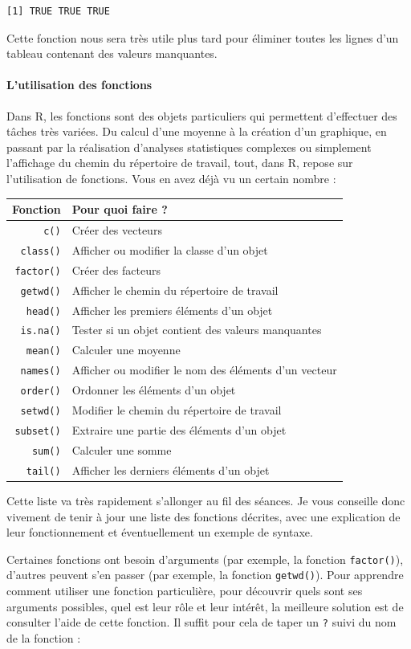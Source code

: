 \documentclass[a4paperpaper,]{article}
\let\oldparagraph\paragraph
\renewcommand{\paragraph}[1]{\oldparagraph{#1}\mbox{}}
\begin{document}
\begin{verbatim}
[1] TRUE TRUE TRUE
\end{verbatim}

Cette fonction nous sera très utile plus tard pour éliminer toutes les lignes d'un tableau contenant des valeurs manquantes.

\hypertarget{functions}{%
\paragraph{L'utilisation des fonctions}\label{functions}}

Dans R, les fonctions sont des objets particuliers qui permettent d'effectuer des tâches très variées. Du calcul d'une moyenne à la création d'un graphique, en passant par la réalisation d'analyses statistiques complexes ou simplement l'affichage du chemin du répertoire de travail, tout, dans R, repose sur l'utilisation de fonctions. Vous en avez déjà vu un certain nombre :

\begin{longtable}[]{@{}rl@{}}
\toprule
Fonction & Pour quoi faire ?\tabularnewline
\midrule
\endhead
\texttt{c()} & Créer des vecteurs\tabularnewline
\texttt{class()} & Afficher ou modifier la classe d'un objet\tabularnewline
\texttt{factor()} & Créer des facteurs\tabularnewline
\texttt{getwd()} & Afficher le chemin du répertoire de travail\tabularnewline
\texttt{head()} & Afficher les premiers éléments d'un objet\tabularnewline
\texttt{is.na()} & Tester si un objet contient des valeurs manquantes\tabularnewline
\texttt{mean()} & Calculer une moyenne\tabularnewline
\texttt{names()} & Afficher ou modifier le nom des éléments d'un vecteur\tabularnewline
\texttt{order()} & Ordonner les éléments d'un objet\tabularnewline
\texttt{setwd()} & Modifier le chemin du répertoire de travail\tabularnewline
\texttt{subset()} & Extraire une partie des éléments d'un objet\tabularnewline
\texttt{sum()} & Calculer une somme\tabularnewline
\texttt{tail()} & Afficher les derniers éléments d'un objet\tabularnewline
\bottomrule
\end{longtable}

Cette liste va très rapidement s'allonger au fil des séances. Je vous conseille donc vivement de tenir à jour une liste des fonctions décrites, avec une explication de leur fonctionnement et éventuellement un exemple de syntaxe.

Certaines fonctions ont besoin d'arguments (par exemple, la fonction \texttt{factor()}), d'autres peuvent s'en passer (par exemple, la fonction \texttt{getwd()}). Pour apprendre comment utiliser une fonction particulière, pour découvrir quels sont ses arguments possibles, quel est leur rôle et leur intérêt, la meilleure solution est de consulter l'aide de cette fonction. Il suffit pour cela de taper un \texttt{?} suivi du nom de la fonction :
\end{document}
